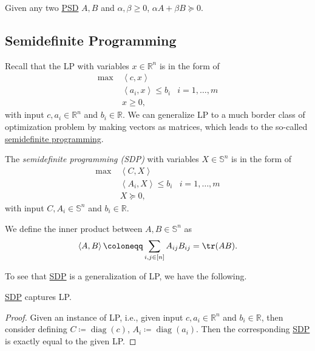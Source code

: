 \begin{remark}
	Given any two \hyperref[def:PSD]{PSD} \(A, B\) and \(\alpha , \beta \geq 0\), \(\alpha A + \beta B \succeq 0\).
\end{remark}

\subsection{Semidefinite Programming}
Recall that the LP with variables \(x\in \mathbb{R} ^n\) is in the form of
\[
	\begin{aligned}
		\max~ & \left\langle c, x \right\rangle                             \\
		      & \left\langle a_i, x \right\rangle \leq b_i & i=1, \dots , m \\
		      & x \geq 0,
	\end{aligned}
\]
with input \(c, a_i\in \mathbb{R} ^n\) and \(b_i\in \mathbb{R} \). We can generalize LP to a much border class of optimization problem by making vectors as matrices, which leads to the so-called \hyperref[def:SDP]{semidefinite programming}.

\begin{definition}\label{def:SDP}
	The \emph{semidefinite programming (SDP)} with variables \(X\in \mathbb{S} ^n\) is in the form of
	\[
		\begin{aligned}
			\max~ & \left\langle C, X \right\rangle                             \\
			      & \left\langle A_i, X \right\rangle \leq b_i & i=1, \dots , m \\
			      & X \succeq 0,
		\end{aligned}
	\]
	with input \(C, A_i\in \mathbb{S} ^n\) and \(b_i\in \mathbb{R} \).
\end{definition}

\begin{remark}
	We define the inner product between \(A, B\in \mathbb{S} ^n\) as
	\[
		\left\langle A, B \right\rangle \coloneqq \sum_{i, j\in [n]} A_{ij} B_{ij} = \tr(AB).
	\]
\end{remark}

To see that \hyperref[def:SDP]{SDP} is a generalization of LP, we have the following.

\begin{lemma}
	\hyperref[def:SDP]{SDP} captures LP.
\end{lemma}
\begin{proof}
	Given an instance of LP, i.e., given input \(c, a_i\in \mathbb{R} ^n\) and \(b_i\in \mathbb{R} \), then consider defining \(C\coloneqq \mathop{\mathrm{diag}}(c)\), \(A_i \coloneqq \mathop{\mathrm{diag}}(a_i)\). Then the corresponding \hyperref[def:SDP]{SDP} is exactly equal to the given LP.
\end{proof}

